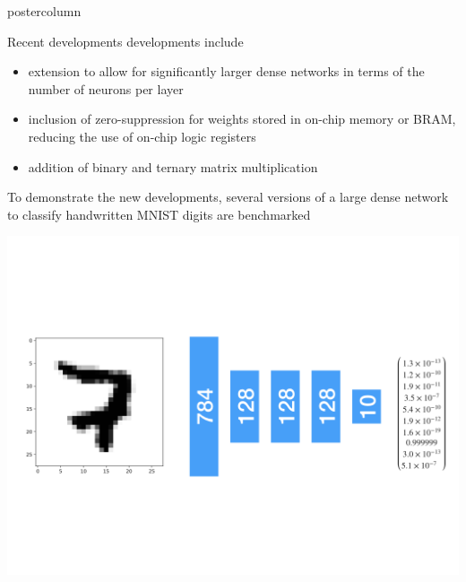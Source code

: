 \documentclass[final,hyperref={pdfpagelabels=false}]{beamer}
\begin{document}
\begin{frame}
\begin{columns}
\begin{column}{.49\textwidth}
\begin{beamercolorbox}[center,wd=\textwidth]{postercolumn}
\begin{minipage}[T]{.95\textwidth}
{\begin{block}{Recent developments}
                    developments include
                    \begin{itemize}
                    \item extension to allow for
                      significantly larger dense networks in terms of the number of neurons per layer
                    \item inclusion of zero-suppression for weights
                      stored in on-chip memory or BRAM, reducing the use of on-chip logic registers
                    \item addition of binary and ternary matrix multiplication
                    \end{itemize}
                    To demonstrate the new developments, several versions of a large dense network to classify handwritten MNIST digits are benchmarked
                    \begin{center}
                    \includegraphics[viewport=0 180 1024 600, clip=true,width=\linewidth]{MNIST_big.png}
                  \end{center}
                  \begin{center}
\end{center}
\end{block}}
\end{minipage}
\end{beamercolorbox}
\end{column}
\end{columns}
\end{frame}
\end{document}
